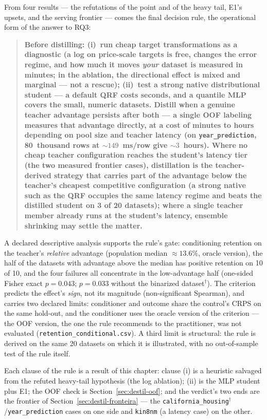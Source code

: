From four results --- the refutations of the point and of the
heavy tail, E1's upsets, and the serving frontier ---
comes the final
decision rule, the operational form of the answer to RQ3:

\begin{quote}
\textbf{Before distilling: (i)~run cheap target transformations as
a diagnostic
(a log on price-scale targets is free, changes the error regime,
and how much it moves \emph{your} dataset is measured in minutes;
in the ablation, the directional effect is mixed and marginal ---
not a rescue);
(ii)~test a strong native distributional student --- a default QRF
costs seconds, and a quantile MLP covers the small, numeric
datasets. Distill when a genuine teacher advantage persists after
both --- a single OOF labeling measures that
advantage directly, at a cost of minutes to hours depending on pool
size and teacher latency (on \texttt{year\_\allowbreak prediction},
80~thousand rows at ${\sim}149$~ms/row give ${\sim}3$~hours). Where
no cheap teacher configuration reaches
the student's latency tier (the two measured frontier cases),
distillation is the teacher-derived strategy that carries part of
the advantage below the teacher's cheapest competitive
configuration (a strong native such as the QRF occupies the same
latency regime and beats the distilled student on 3 of 20
datasets); where a single
teacher member already runs at the student's latency, ensemble
shrinking may settle the matter.}
\end{quote}

A declared descriptive analysis supports the rule's gate:
conditioning retention on the teacher's \emph{relative} advantage
(population median ${\approx}13.6\%$, oracle version), the half of
the datasets with advantage above the median has
positive retention on 10 of 10, and the four failures all
concentrate in the low-advantage half (one-sided Fisher exact
$p{=}0.043$; $p{=}0.033$ without the binarized
dataset$^\dagger$). The criterion predicts the effect's \emph{sign},
not its magnitude (non-significant Spearman), and carries two
declared limits: conditioner and outcome share the control's CRPS
on the same hold-out, and the conditioner uses the oracle version
of the criterion --- the OOF version, the one the rule recommends
to the practitioner, was not evaluated
(\texttt{retention\_\allowbreak conditional.csv}). A third limit is
structural: the rule is derived on the same 20 datasets on which it
is illustrated, with no out-of-sample test of the rule itself.

Each clause of the rule is a result of this chapter: clause (i) is
a heuristic salvaged from the refuted heavy-tail hypothesis (the
log ablation); (ii) is the MLP student plus E1; the OOF check is
Section~\ref{sec:destil-oof}; and the verdict's two ends are the
frontier of Section~\ref{sec:destil-fronteira} --- the
\texttt{california\_\allowbreak housing}$^\dagger$/\texttt{year\_\allowbreak prediction}
cases on one side and \texttt{kin8nm} (a latency case) on the
other.

